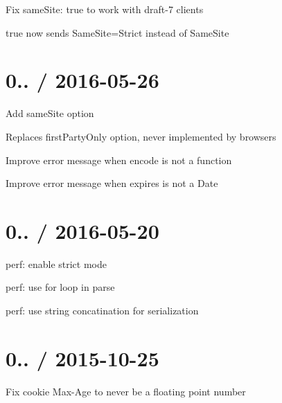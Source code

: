 
\begin{DoxyItemize}
\item Fix {\ttfamily same\+Site\+: true} to work with draft-\/7 clients
\begin{DoxyItemize}
\item {\ttfamily true} now sends {\ttfamily Same\+Site=Strict} instead of {\ttfamily Same\+Site}
\end{DoxyItemize}
\end{DoxyItemize}

\section*{0.. / 2016-\/05-\/26 }


\begin{DoxyItemize}
\item Add {\ttfamily same\+Site} option
\begin{DoxyItemize}
\item Replaces {\ttfamily first\+Party\+Only} option, never implemented by browsers
\end{DoxyItemize}
\item Improve error message when {\ttfamily encode} is not a function
\item Improve error message when {\ttfamily expires} is not a {\ttfamily Date}
\end{DoxyItemize}

\section*{0.. / 2016-\/05-\/20 }


\begin{DoxyItemize}
\item perf\+: enable strict mode
\item perf\+: use for loop in parse
\item perf\+: use string concatination for serialization
\end{DoxyItemize}

\section*{0.. / 2015-\/10-\/25 }


\begin{DoxyItemize}
\item Fix cookie {\ttfamily Max-\/\+Age} to never be a floating point number
\end{DoxyItemize}

